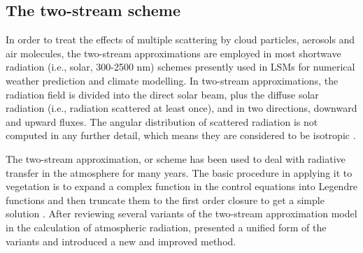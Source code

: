 \subsection{The two-stream scheme}\label{sec:2st_scheme}

In order to treat the effects of multiple scattering by cloud particles, aerosols and air molecules, the two-stream approximations are employed in most shortwave radiation (i.e., solar, 300-2500 nm) schemes presently used in LSMs for numerical weather prediction and climate modelling. In two-stream approximations, the radiation field is divided into the direct solar beam, plus the diffuse solar radiation (i.e., radiation scattered at least once), and in two directions, downward and upward fluxes. The angular distribution of scattered radiation is not computed in any further detail, which means they are considered to be isotropic \citep{Raisaenen2002}. 

The two-stream approximation, or scheme has been used to deal with radiative transfer in the atmosphere for many years. The basic procedure in applying it to vegetation is to expand a complex function in the control equations into Legendre functions and then truncate them to the first order closure to get a simple solution \citep{Dai2007}. After reviewing several variants of the two-stream approximation model in the calculation of atmospheric radiation, \citet{Meador1980} presented a unified form of the variants and introduced a new and improved method.


